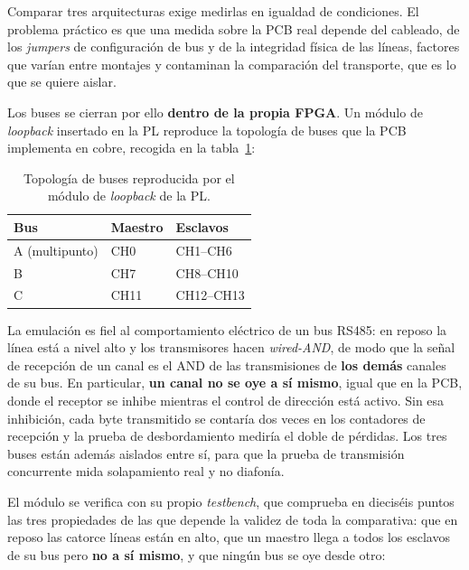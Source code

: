 Comparar tres arquitecturas exige medirlas en igualdad de condiciones. El problema práctico es
que una medida sobre la PCB real depende del cableado, de los \textit{jumpers} de configuración de bus y
de la integridad física de las líneas, factores que varían entre montajes y contaminan la
comparación del transporte, que es lo que se quiere aislar.

Los buses se cierran por ello \textbf{dentro de la propia FPGA}. Un módulo de \textit{loopback}
insertado en la PL reproduce la topología de buses que la PCB implementa en cobre, recogida en la
tabla~\ref{tab:loopback_buses}:

\begin{table}[H]
    \centering
    \begin{tabular}{lll}
        \hline
        \textbf{Bus} & \textbf{Maestro} & \textbf{Esclavos} \\
        \hline
        A (multipunto) & CH0  & CH1--CH6 \\
        B              & CH7  & CH8--CH10 \\
        C              & CH11 & CH12--CH13 \\
        \hline
    \end{tabular}
    \caption{Topología de buses reproducida por el módulo de \textit{loopback} de la PL.}
    \label{tab:loopback_buses}
\end{table}

La emulación es fiel al comportamiento eléctrico de un bus RS485: en reposo la línea está a
nivel alto y los transmisores hacen \textit{wired-AND}, de modo que la señal de recepción de un
canal es el AND de las transmisiones de \textbf{los demás} canales de su bus. En particular,
\textbf{un canal no se oye a sí mismo}, igual que en la PCB, donde el receptor se inhibe mientras
el control de dirección está activo. Sin esa inhibición, cada byte transmitido se contaría dos
veces en los contadores de recepción y la prueba de desbordamiento mediría el doble de pérdidas. Los tres buses están además aislados entre sí, para
que la prueba de transmisión concurrente mida solapamiento real y no diafonía.

El módulo se verifica con su propio \textit{testbench}, que comprueba en dieciséis puntos las tres
propiedades de las que depende la validez de toda la comparativa: que en reposo las catorce líneas
están en alto, que un maestro llega a todos los esclavos de su bus pero \textbf{no a sí mismo}, y
que ningún bus se oye desde otro:

